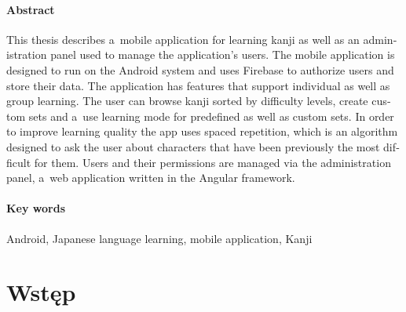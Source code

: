 \documentclass[a4paper,twoside,12pt]{book}
\newcounter{stronyPozaNumeracja}
\begin{document}
\subsubsection*{Abstract} 
\begin{otherlanguage}{british}

This thesis describes a~mobile application for learning kanji as well as an administration panel used to manage the application's users. The mobile application is designed to run on the Android system and uses Firebase to authorize users and store their data. The application has features that support individual as well as group learning. The user can browse kanji sorted by difficulty levels, create custom sets and a~use learning mode for predefined as well as custom sets. In order to improve learning quality the app uses spaced repetition, which is an algorithm designed to ask the user about characters that have been previously the most difficult for them. Users and their permissions are managed via the administration panel, a~web application written in the Angular framework.

\end{otherlanguage}
\subsubsection*{Key words}  
\begin{otherlanguage}{british}
Android, Japanese language learning, mobile application, Kanji
\end{otherlanguage}

\tableofcontents

\setcounter{stronyPozaNumeracja}{\value{page}}
\mainmatter
\pagestyle{empty}

\cleardoublepage

\pagestyle{NumeryStronNazwyRozdzialow}


\chapter{Wstęp}
\label{ch:wstep}
\end{document}
